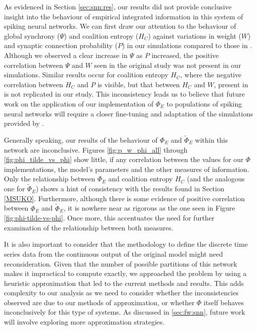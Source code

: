 \documentclass[a4paper,11pt]{article}
\begin{document}
As evidenced in Section \ref{sec:snn:res}, our results did not provide conclusive insight into the behaviour of empirical integrated information in this system of spiking neural networks. We can first draw our attention to the behaviour of global synchrony ($\Psi$) and coalition entropy ($H_C$) against variations in weight ($W$) and synaptic connection probability ($P$) in our simulations compared to those in \cite{Bhowmik2013}. Although we observed a clear increase in $\Psi$ as $P$ increased, the positive correlation between $\Psi$ and $W$ seen in the original study was not present in our simulations. Similar results occur for coalition entropy $H_C$, where the negative correlation between $H_C$ and $P$ is visible, but that between $H_C$ and $W$, present in \cite{Bhowmik2013} is not replicated in our study. This inconsistency leads us to believe that future work on the application of our implementation of $\Phi_E$ to populations of spiking neural networks will require a closer fine-tuning and adaptation of the simulations provided by \cite{Bhowmik2013}.

Generally speaking, our results of the behaviour of $\Phi_E$ and $\widetilde{\Phi}_E$ within this network are inconclusive. Figures \ref{fig:p_w_phi_all} through \ref{fig:phi_tilde_vs_phi} show little, if any correlation between the values for our $\Phi$ implementations, the model's parameters and the other measures of information. Only the relationship between $\Phi_E$ and coalition entropy $H_C$ (and the analogous one for $\widetilde{\Phi}_E$) shows a hint of consistency with the results found in Section \ref{MSUKO}. Furthermore, although there is some evidence of positive correlation between $\Phi_E$ and $\widetilde{\Phi}_E$, it is nowhere near as rigorous as the one seen in Figure \ref{fig:phi-tilde-vs-phi}. Once more, this accentuates the need for further examination of the relationship between both measures. 

It is also important to consider that the methodology to define the discrete time series data from the continuous output of the original model might need reconsideration. Given that the number of possible partitions of this network makes it impractical to compute exactly, we approached the problem by using a heuristic approximation that led to the current methods and results. This adds complexity to our analysis as we need to consider whether the inconsistencies observed are due to our methods of approximation, or whether $\Phi$ itself behaves inconclusively for this type of systems. As discussed in \ref{sec:fw:snn}, future work will involve exploring more approximation strategies.
\end{document}
